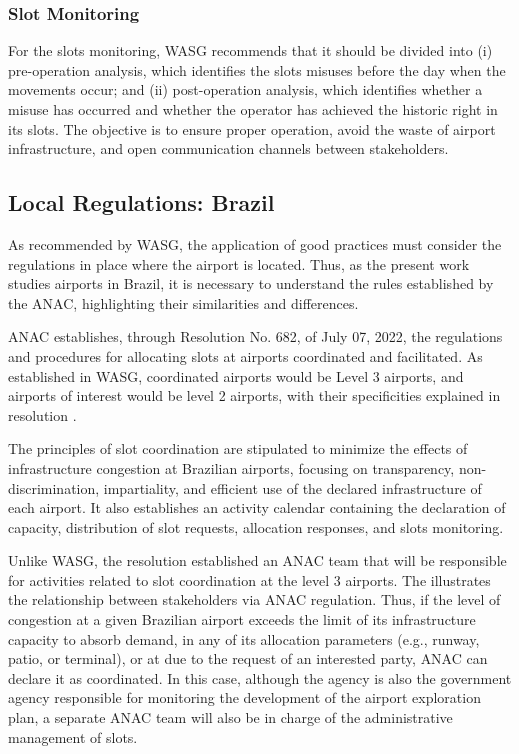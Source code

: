 %

\subsubsection{Slot Monitoring}

For the slots monitoring, \acrshort{WASG} recommends that it should be divided into (i) pre-operation analysis, which identifies the slots misuses before the day when the movements occur; and (ii) post-operation analysis, which identifies whether a misuse has occurred and whether the operator has achieved the historic right in its slots. The objective is to ensure proper operation, avoid the waste of airport infrastructure, and open communication channels between stakeholders.

\subsection{Local Regulations: Brazil}

As recommended by \acrshort{WASG}, the application of good practices must consider the regulations in place where the airport is located. Thus, as the present work studies airports in Brazil, it is necessary to understand the rules established by the \acrshort{ANAC}, highlighting their similarities and differences.

\acrshort{ANAC} establishes, through Resolution No. 682, of July 07, 2022, the regulations and procedures for allocating slots at airports coordinated and facilitated. As established in \acrshort{WASG}, coordinated airports would be Level 3 airports, and airports of interest would be level 2 airports, with their specificities explained in resolution \cite{ANAC682}.

The principles of slot coordination are stipulated to minimize the effects of infrastructure congestion at Brazilian airports, focusing on transparency, non-discrimination, impartiality, and efficient use of the declared infrastructure of each airport. It also establishes an activity calendar containing the declaration of capacity, distribution of slot requests, allocation responses, and slots monitoring.

Unlike \acrshort{WASG}, the resolution established an \acrshort{ANAC} team that will be responsible for activities related to slot coordination at the level 3 airports. The  illustrates the relationship between stakeholders via \acrshort{ANAC} regulation. Thus, if the level of congestion at a given Brazilian airport exceeds the limit of its infrastructure capacity to absorb demand, in any of its allocation parameters (e.g., runway, patio, or terminal), or at due to the request of an interested party, \acrshort{ANAC} can declare it as coordinated. In this case, although the agency is also the government agency responsible for monitoring the development of the airport exploration plan, a separate \acrshort{ANAC} team will also be in charge of the administrative management of slots.

